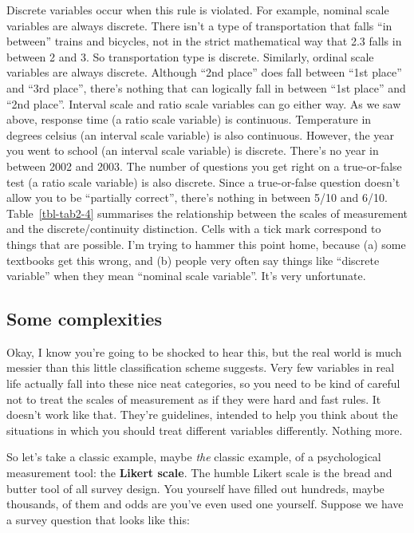 \documentclass[
  a4paper,
]{book}
\begin{document}
Discrete variables occur when this rule is violated. For example,
nominal scale variables are always discrete. There isn't a type of
transportation that falls ``in between'' trains and bicycles, not in the
strict mathematical way that 2.3 falls in between 2 and 3. So
transportation type is discrete. Similarly, ordinal scale variables are
always discrete. Although ``2nd place'' does fall between ``1st place''
and ``3rd place'', there's nothing that can logically fall in between
``1st place'' and ``2nd place''. Interval scale and ratio scale
variables can go either way. As we saw above, response time (a ratio
scale variable) is continuous. Temperature in degrees celsius (an
interval scale variable) is also continuous. However, the year you went
to school (an interval scale variable) is discrete. There's no year in
between 2002 and 2003. The number of questions you get right on a
true-or-false test (a ratio scale variable) is also discrete. Since a
true-or-false question doesn't allow you to be ``partially correct'',
there's nothing in between 5/10 and 6/10. Table~\ref{tbl-tab2-4}
summarises the relationship between the scales of measurement and the
discrete/continuity distinction. Cells with a tick mark correspond to
things that are possible. I'm trying to hammer this point home, because
(a) some textbooks get this wrong, and (b) people very often say things
like ``discrete variable'' when they mean ``nominal scale variable''.
It's very unfortunate.

\hypertarget{some-complexities}{%
\subsection{Some complexities}\label{some-complexities}}

Okay, I know you're going to be shocked to hear this, but the real world
is much messier than this little classification scheme suggests. Very
few variables in real life actually fall into these nice neat
categories, so you need to be kind of careful not to treat the scales of
measurement as if they were hard and fast rules. It doesn't work like
that. They're guidelines, intended to help you think about the
situations in which you should treat different variables differently.
Nothing more.

So let's take a classic example, maybe \emph{the} classic example, of a
psychological measurement tool: the \textbf{Likert scale}. The humble
Likert scale is the bread and butter tool of all survey design. You
yourself have filled out hundreds, maybe thousands, of them and odds are
you've even used one yourself. Suppose we have a survey question that
looks like this:
\end{document}
